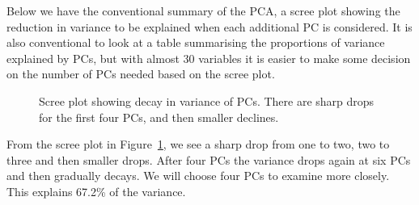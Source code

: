 \documentclass[
  letterpaper,
]{krantz}
\begin{document}
Below we have the conventional summary of the PCA, a scree plot showing
the reduction in variance to be explained when each additional PC is
considered. It is also conventional to look at a table summarising the
proportions of variance explained by PCs, but with almost 30 variables
it is easier to make some decision on the number of PCs needed based on
the scree plot.

\begin{figure}


\caption{\label{fig-aflw-pca}Scree plot showing decay in variance of
PCs. There are sharp drops for the first four PCs, and then smaller
declines.}

\end{figure}%


From the scree plot in Figure~\ref{fig-aflw-pca}, we see a sharp drop
from one to two, two to three and then smaller drops. After four PCs the
variance drops again at six PCs and then gradually decays. We will
choose four PCs to examine more closely. This explains 67.2\% of the
variance.
\end{document}
